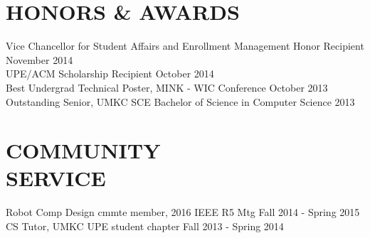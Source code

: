 \documentclass[line,margin]{res}
\begin{document}
\begin{resume}
\section{HONORS \& AWARDS}
		Vice Chancellor for Student Affairs and Enrollment Management Honor Recipient \hfill November 2014\\
		UPE/ACM Scholarship Recipient \hfill October 2014 \\
		Best Undergrad Technical Poster, MINK - WIC Conference \hfill October 2013	\\
		Outstanding Senior, UMKC SCE Bachelor of Science in Computer Science \hfill 2013
\section{COMMUNITY \\ SERVICE}  
        Robot Comp Design cmmte member, 2016 IEEE R5 Mtg \hfill Fall 2014 - Spring 2015\\  
        CS Tutor, UMKC UPE student chapter  \hfill Fall 2013 - Spring 2014
\end{resume}
\end{document}

